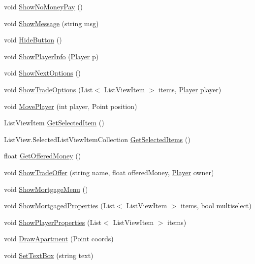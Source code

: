 \begin{DoxyCompactItemize}
\item 
void \mbox{\hyperlink{class_monopoly_1_1_main_1_1_monopoly_a53ef720a23cd66cc563b357c94351a3a}{Show\+No\+Money\+Pay}} ()
\item 
void \mbox{\hyperlink{class_monopoly_1_1_main_1_1_monopoly_a34735d370c2fa7061965aab438de7cb4}{Show\+Message}} (string msg)
\item 
void \mbox{\hyperlink{class_monopoly_1_1_main_1_1_monopoly_a97e18d6cc1b63c87022451514ea8bce9}{Hide\+Button}} ()
\item 
void \mbox{\hyperlink{class_monopoly_1_1_main_1_1_monopoly_a66343fe4f4d61b53b09da023830b7ec2}{Show\+Player\+Info}} (\mbox{\hyperlink{class_monopoly_1_1_players_1_1_player}{Player}} p)
\item 
void \mbox{\hyperlink{class_monopoly_1_1_main_1_1_monopoly_a977c5ee928577d2b20660f14b4e2f44d}{Show\+Next\+Options}} ()
\item 
void \mbox{\hyperlink{class_monopoly_1_1_main_1_1_monopoly_a67590bc6e27eed13ba1469ee4b7774b6}{Show\+Trade\+Options}} (List$<$ List\+View\+Item $>$ items, \mbox{\hyperlink{class_monopoly_1_1_players_1_1_player}{Player}} player)
\item 
void \mbox{\hyperlink{class_monopoly_1_1_main_1_1_monopoly_ababe5173d26978e1138739df04353c8e}{Move\+Player}} (int player, Point position)
\item 
List\+View\+Item \mbox{\hyperlink{class_monopoly_1_1_main_1_1_monopoly_abebb7a3f614747aaa2e236ca1f1ab514}{Get\+Selected\+Item}} ()
\item 
List\+View.\+Selected\+List\+View\+Item\+Collection \mbox{\hyperlink{class_monopoly_1_1_main_1_1_monopoly_a1cd60b17d6bfeab1256c981bfa60aa48}{Get\+Selected\+Items}} ()
\item 
float \mbox{\hyperlink{class_monopoly_1_1_main_1_1_monopoly_a26cfbb9288692b22018a7a57612bca71}{Get\+Offered\+Money}} ()
\item 
void \mbox{\hyperlink{class_monopoly_1_1_main_1_1_monopoly_ab13644f37e45aae5108e93a91161dad8}{Show\+Trade\+Offer}} (string name, float offered\+Money, \mbox{\hyperlink{class_monopoly_1_1_players_1_1_player}{Player}} owner)
\item 
void \mbox{\hyperlink{class_monopoly_1_1_main_1_1_monopoly_ab2ffd87505a3339dbc459b2fadb4690f}{Show\+Mortgage\+Menu}} ()
\item 
void \mbox{\hyperlink{class_monopoly_1_1_main_1_1_monopoly_aac4736f8813f5e5768602cc4bd27b04e}{Show\+Mortgaged\+Properties}} (List$<$ List\+View\+Item $>$ items, bool multiselect)
\item 
void \mbox{\hyperlink{class_monopoly_1_1_main_1_1_monopoly_a31c1b4634e2034ade5b0873e8378ce6e}{Show\+Player\+Properties}} (List$<$ List\+View\+Item $>$ items)
\item 
void \mbox{\hyperlink{class_monopoly_1_1_main_1_1_monopoly_ad5454dfc74b4a3872171c2cfec73bf66}{Draw\+Apartment}} (Point coords)
\item 
void \mbox{\hyperlink{class_monopoly_1_1_main_1_1_monopoly_a8bdf26b07f8ab71c8bacf754095b4cc7}{Set\+Text\+Box}} (string text)
\end{DoxyCompactItemize}
